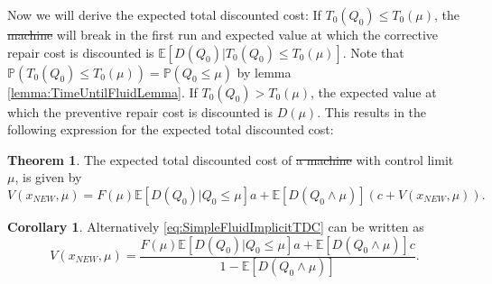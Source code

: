 \documentclass[a4paper]{thesis}
\theoremstyle{definition}
\newtheorem{corollary}{Corollary}[chapter]
\newtheorem{theorem}{Theorem}[chapter] %
\providecommand{\DIFaddtex}[1]{{\protect\color{blue}\uwave{#1}}} %
\providecommand{\DIFdeltex}[1]{{\protect\color{red}\sout{#1}}}                      %
\providecommand{\DIFaddbegin}{} %
\providecommand{\DIFaddend}{} %
\providecommand{\DIFdelbegin}{} %
\providecommand{\DIFdelend}{} %
\providecommand{\DIFadd}[1]{\texorpdfstring{\DIFaddtex{#1}}{#1}} %
\providecommand{\DIFdel}[1]{\texorpdfstring{\DIFdeltex{#1}}{}} %
\newcommand{\DIFscaledelfig}{0.5}
\newlength{\DIFdelgraphicswidth} %
\newlength{\DIFdelgraphicsheight} %
\newcommand{\DIFaddincludegraphics}[2][]{{\color{blue}\fbox{\DIFOincludegraphics[#1]{#2}}}} %
\newcommand{\DIFdelincludegraphics}[2][]{%
	\sbox{\DIFdelgraphicsbox}{\DIFOincludegraphics[#1]{#2}}%
	\settoboxwidth{\DIFdelgraphicswidth}{\DIFdelgraphicsbox} %
	\settoboxtotalheight{\DIFdelgraphicsheight}{\DIFdelgraphicsbox} %
	\scalebox{\DIFscaledelfig}{%
		\parbox[b]{\DIFdelgraphicswidth}{\usebox{\DIFdelgraphicsbox}\\[-\baselineskip] \rule{\DIFdelgraphicswidth}{0em}}\llap{\resizebox{\DIFdelgraphicswidth}{\DIFdelgraphicsheight}{%
				\setlength{\unitlength}{\DIFdelgraphicswidth}%
				\begin{picture}(1,1)%
				\thicklines\linethickness{2pt} %
				{\color[rgb]{1,0,0}\put(0,0){\framebox(1,1){}}}%
				{\color[rgb]{1,0,0}\put(0,0){\line( 1,1){1}}}%
				{\color[rgb]{1,0,0}\put(0,1){\line(1,-1){1}}}%
				\end{picture}%
			}\hspace*{3pt}}} %
} %
\DeclareRobustCommand{\DIFaddbegin}{\DIFOaddbegin \let\includegraphics\DIFaddincludegraphics} %
\DeclareRobustCommand{\DIFaddend}{\DIFOaddend \let\includegraphics\DIFOincludegraphics} %
\DeclareRobustCommand{\DIFdelbegin}{\DIFOdelbegin \let\includegraphics\DIFdelincludegraphics} %
\DeclareRobustCommand{\DIFdelend}{\DIFOaddend \let\includegraphics\DIFOincludegraphics} %
\begin{document}
	Now we will derive the expected total discounted cost:
	If $T_0(Q_0)\leq T_0(\mu)$, the \DIFdelbegin \DIFdel{machine }\DIFdelend \DIFaddbegin \DIFadd{asset }\DIFaddend will break in the first run and expected value at which the corrective repair cost is discounted is $\mathbb{E}[D(Q_0)|T_0(Q_0)\leq T_0(\mu)]$.
	Note that $\mathbb{P}(T_0(Q_0)\leq T_0(\mu))=\mathbb{P}(Q_0\leq\mu)$ by lemma \ref{lemma:TimeUntilFluidLemma}.
	If $T_0(Q_0)> T_0(\mu)$, the expected value at which the preventive repair cost is discounted is $D(\mu)$.
	This results in the following expression for the expected total discounted cost:
	\begin{theorem}
		The expected total discounted cost of \DIFdelbegin \DIFdel{a machine }\DIFdelend \DIFaddbegin \DIFadd{an asset }\DIFaddend with control limit $\mu$, is given by
		\begin{equation}\label{eq:SimpleFluidImplicitTDC}
		V(x_{NEW},\mu)=F(\mu)\mathbb{E}[D(Q_0)|Q_0\leq \mu]a+\mathbb{E}[D(Q_0\wedge\mu)](c+V(x_{NEW},\mu)).
		\end{equation}
	\end{theorem}
	
	\begin{corollary}
		Alternatively \eqref{eq:SimpleFluidImplicitTDC} can be written as
		\begin{equation}\label{eq:SimpleFluidExplicitTDC}
		V(x_{NEW},\mu)=\frac{F(\mu)\mathbb{E}[D(Q_0)|Q_0\leq \mu]a+\mathbb{E}[D(Q_0\wedge\mu)]c}{1-\mathbb{E}[D(Q_0\wedge\mu)]}.
		\end{equation}
	\end{corollary}
	
\end{document}
